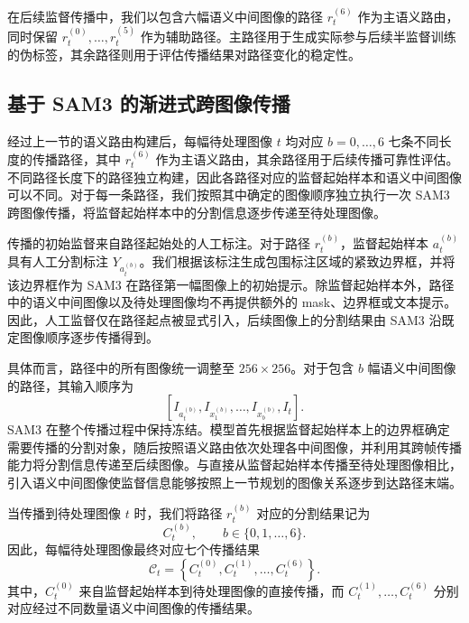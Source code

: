 \documentclass[UTF8,a4paper,10pt,twocolumn]{ctexart}
\begin{document}
在后续监督传播中，我们以包含六幅语义中间图像的路径 $r_t^{(6)}$ 作为主语义路由，同时保留 $r_t^{(0)},\ldots,r_t^{(5)}$ 作为辅助路径。主路径用于生成实际参与后续半监督训练的伪标签，其余路径则用于评估传播结果对路径变化的稳定性。






\subsection{基于 SAM3 的渐进式跨图像传播}
\label{sec:sam3-propagation}

经过上一节的语义路由构建后，每幅待处理图像 $t$ 均对应 $b=0,\ldots,6$ 七条不同长度的传播路径，其中 $r_t^{(6)}$ 作为主语义路由，其余路径用于后续传播可靠性评估。不同路径长度下的路径独立构建，因此各路径对应的监督起始样本和语义中间图像可以不同。对于每一条路径，我们按照其中确定的图像顺序独立执行一次 SAM3 跨图像传播，将监督起始样本中的分割信息逐步传递至待处理图像。

传播的初始监督来自路径起始处的人工标注。对于路径 $r_t^{(b)}$，监督起始样本 $a_t^{(b)}$ 具有人工分割标注 $Y_{a_t^{(b)}}$。我们根据该标注生成包围标注区域的紧致边界框，并将该边界框作为 SAM3 在路径第一幅图像上的初始提示。除监督起始样本外，路径中的语义中间图像以及待处理图像均不再提供额外的 mask、边界框或文本提示。因此，人工监督仅在路径起点被显式引入，后续图像上的分割结果由 SAM3 沿既定图像顺序逐步传播得到。

具体而言，路径中的所有图像统一调整至 $256\times256$。对于包含 $b$ 幅语义中间图像的路径，其输入顺序为
\begin{equation}
\left[
I_{a_t^{(b)}},
I_{x_1^{(b)}},
\ldots,
I_{x_b^{(b)}},
I_t
\right].
\end{equation}
SAM3 在整个传播过程中保持冻结。模型首先根据监督起始样本上的边界框确定需要传播的分割对象，随后按照语义路由依次处理各中间图像，并利用其跨帧传播能力将分割信息传递至后续图像。与直接从监督起始样本传播至待处理图像相比，引入语义中间图像使监督信息能够按照上一节规划的图像关系逐步到达路径末端。

当传播到待处理图像 $t$ 时，我们将路径 $r_t^{(b)}$ 对应的分割结果记为
\begin{equation}
C_t^{(b)},
\qquad
b\in\{0,1,\ldots,6\}.
\end{equation}
因此，每幅待处理图像最终对应七个传播结果
\begin{equation}
\mathcal{C}_t
=
\left\{
C_t^{(0)},
C_t^{(1)},
\ldots,
C_t^{(6)}
\right\}.
\end{equation}
其中，$C_t^{(0)}$ 来自监督起始样本到待处理图像的直接传播，而 $C_t^{(1)},\ldots,C_t^{(6)}$ 分别对应经过不同数量语义中间图像的传播结果。
\end{document}
